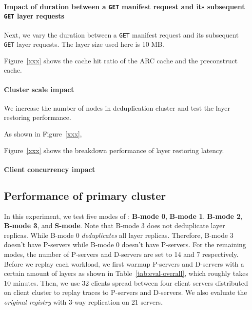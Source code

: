 \paragraph{Impact of duration between a \texttt{GET} manifest request and its subsequent \texttt{GET} layer requests}
Next, 
we vary 
the duration between a \texttt{GET} manifest request and its subsequent \texttt{GET} layer requests.
The layer size used here is 10 MB.

Figure~\ref{xxx} shows the cache hit ratio of the ARC cache and the preconstruct cache.

\paragraph{Cluster scale impact}
We increase the number of nodes in \sysname deduplication cluster and test the layer restoring performance.

As shown in Figure~\ref{xxx},



Figure~\ref{xxx} shows the breakdown performance of layer restoring latency.


\paragraph{Client concurrency impact}





\subsection{Performance of primary cluster }
In this experiment,
we test five modes of \sysname:
\textbf{B-mode 0},
\textbf{B-mode 1},
\textbf{B-mode 2},
\textbf{B-mode 3}, and
\textbf{S-mode}.
Note that B-mode 3 does not deduplicate layer replicas.
While B-mode 0 \emph{deduplicates} all layer replicas. 
Therefore, B-mode 3 doesn't have P-servers while
B-mode 0 doesn't have P-servers.
For the remaining modes,
the number of P-servers and D-servers are set to 14 and 7 respectively.
Before we replay each workload, we first warmup P-servers and D-servers with a certain amount of layers as shown in Table~\ref{tab:eval-overall}, which roughly takes 10 minutes.
Then, we use 32 clients spread between four client servers distributed on client cluster to replay traces to P-servers and D-servers.
We also evaluate the \emph{original registry} with 3-way replication on 21 servers. 

